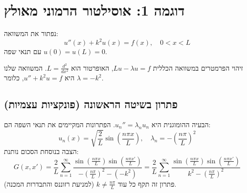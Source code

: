 \section{דוגמה 1: אוסילטור הרמוני מאולץ}

נפתור את המשוואה:
\begin{equation}
    u''(x) + k^2 u(x) = f(x), \quad 0 < x < L
\end{equation}
עם תנאי שפה $u(0) = u(L) = 0$.
\begin{notebox}{זיהוי הפרמטרים}
    במשוואה הכללית $Lu - \lambda u = f$, האופרטור הוא $L = \frac{d^2}{dx^2}$. המשוואה שלנו היא $u'' + k^2 u = f$, כלומר $\lambda = -k^2$.
\end{notebox}

\subsection{פתרון בשיטה הראשונה (פונקציות עצמיות)}
הבעיה ההומוגנית היא $u_n'' = \lambda_n u_n$. הפתרונות המקיימים את תנאי השפה הם:
\begin{equation}
    u_n(x) = \sqrt{\frac{2}{L}} \sin\left(\frac{n\pi x}{L}\right), \quad \lambda_n = -\left(\frac{n\pi}{L}\right)^2
\end{equation}
הצבה בנוסחת הסכום נותנת:
\begin{equation}
    G(x,x') = \frac{2}{L} \sum_{n=1}^{\infty} \frac{\sin(\frac{n\pi x}{L})\sin(\frac{n\pi x'}{L})}{-\left(\frac{n\pi}{L}\right)^2 - (-k^2)} = \frac{2}{L} \sum_{n=1}^{\infty} \frac{\sin(\frac{n\pi x}{L})\sin(\frac{n\pi x'}{L})}{k^2 - (\frac{n\pi}{L})^2}
\end{equation}
פתרון זה תקף כל עוד $k \neq \frac{n\pi}{L}$ (למניעת רזוננס והתבדרות המכנה).

